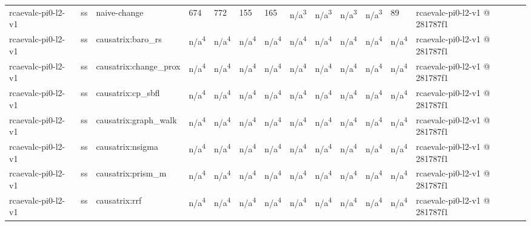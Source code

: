\begin{table}[t]
\begin{tabular}{lllllllllllll}
rcaevalc-pi0-l2-v1 & ss & naive-change & 674 & 772 & 155 & 165 & n/a\textsuperscript{3} & n/a\textsuperscript{3} & n/a\textsuperscript{3} & n/a\textsuperscript{3} & 89 & rcaevalc-pi0-l2-v1 @ 281787f1 \\
rcaevalc-pi0-l2-v1 & ss & causatrix:baro\_rs & n/a\textsuperscript{4} & n/a\textsuperscript{4} & n/a\textsuperscript{4} & n/a\textsuperscript{4} & n/a\textsuperscript{4} & n/a\textsuperscript{4} & n/a\textsuperscript{4} & n/a\textsuperscript{4} & n/a\textsuperscript{4} & rcaevalc-pi0-l2-v1 @ 281787f1 \\
rcaevalc-pi0-l2-v1 & ss & causatrix:change\_prox & n/a\textsuperscript{4} & n/a\textsuperscript{4} & n/a\textsuperscript{4} & n/a\textsuperscript{4} & n/a\textsuperscript{4} & n/a\textsuperscript{4} & n/a\textsuperscript{4} & n/a\textsuperscript{4} & n/a\textsuperscript{4} & rcaevalc-pi0-l2-v1 @ 281787f1 \\
rcaevalc-pi0-l2-v1 & ss & causatrix:cp\_sbfl & n/a\textsuperscript{4} & n/a\textsuperscript{4} & n/a\textsuperscript{4} & n/a\textsuperscript{4} & n/a\textsuperscript{4} & n/a\textsuperscript{4} & n/a\textsuperscript{4} & n/a\textsuperscript{4} & n/a\textsuperscript{4} & rcaevalc-pi0-l2-v1 @ 281787f1 \\
rcaevalc-pi0-l2-v1 & ss & causatrix:graph\_walk & n/a\textsuperscript{4} & n/a\textsuperscript{4} & n/a\textsuperscript{4} & n/a\textsuperscript{4} & n/a\textsuperscript{4} & n/a\textsuperscript{4} & n/a\textsuperscript{4} & n/a\textsuperscript{4} & n/a\textsuperscript{4} & rcaevalc-pi0-l2-v1 @ 281787f1 \\
rcaevalc-pi0-l2-v1 & ss & causatrix:nsigma & n/a\textsuperscript{4} & n/a\textsuperscript{4} & n/a\textsuperscript{4} & n/a\textsuperscript{4} & n/a\textsuperscript{4} & n/a\textsuperscript{4} & n/a\textsuperscript{4} & n/a\textsuperscript{4} & n/a\textsuperscript{4} & rcaevalc-pi0-l2-v1 @ 281787f1 \\
rcaevalc-pi0-l2-v1 & ss & causatrix:prism\_m & n/a\textsuperscript{4} & n/a\textsuperscript{4} & n/a\textsuperscript{4} & n/a\textsuperscript{4} & n/a\textsuperscript{4} & n/a\textsuperscript{4} & n/a\textsuperscript{4} & n/a\textsuperscript{4} & n/a\textsuperscript{4} & rcaevalc-pi0-l2-v1 @ 281787f1 \\
rcaevalc-pi0-l2-v1 & ss & causatrix:rrf & n/a\textsuperscript{4} & n/a\textsuperscript{4} & n/a\textsuperscript{4} & n/a\textsuperscript{4} & n/a\textsuperscript{4} & n/a\textsuperscript{4} & n/a\textsuperscript{4} & n/a\textsuperscript{4} & n/a\textsuperscript{4} & rcaevalc-pi0-l2-v1 @ 281787f1 \\

\end{tabular}
\end{table}
